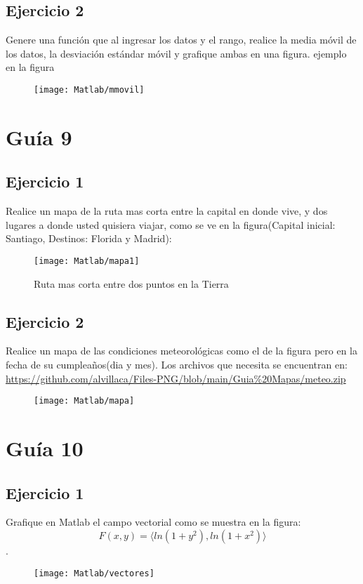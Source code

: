 \subsection{Ejercicio 2}
Genere una función que al ingresar los datos y el rango, realice la media móvil de los datos, la desviación estándar móvil  y grafique ambas en una figura. ejemplo en la figura
\begin{figure}[h]
\centering
\texttt{[image: Matlab/mmovil]}
\label{fig:mmovil}
\end{figure}
\newpage
\section{Guía 9}
\subsection{Ejercicio 1}
Realice un mapa de la ruta mas corta entre la capital en donde vive, y dos lugares a donde usted quisiera viajar, como se ve en la figura(Capital inicial: Santiago, Destinos: Florida y Madrid):\par
\begin{figure}[h]
	\centering
	\texttt{[image: Matlab/mapa1]}
	\caption{Ruta mas corta entre dos puntos en la Tierra}
	\label{fig:mapa1}
\end{figure}
\newpage
\subsection{Ejercicio 2}
Realice un mapa de las condiciones meteorológicas como el de la figura pero en la fecha de su cumpleaños(dia y mes). Los archivos que necesita se encuentran en:\\
\url{https://github.com/alvillaca/Files-PNG/blob/main/Guia\%20Mapas/meteo.zip}
\begin{figure}[h]
	\centering
	\texttt{[image: Matlab/mapa]}
	\label{fig:mapa}
\end{figure}
\newpage
\section{Guía 10}
\subsection{Ejercicio 1}
Grafique en Matlab el campo vectorial como se muestra en la figura:
\begin{equation}
	F(x,y)=\langle ln(1+y^{2}),ln(1+x^{2}) \rangle
\end{equation}.\par 
\begin{figure}[h]
	\centering
	\texttt{[image: Matlab/vectores]}
	\label{fig:vectores}
\end{figure}\newpage
